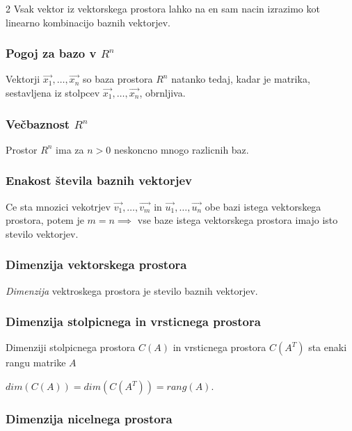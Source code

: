 \documentclass{article}
\begin{document}
\begin{multicols}{2}
	Vsak vektor iz vektorskega prostora lahko na en sam nacin izrazimo
	kot linearno kombinacijo baznih vektorjev.

	\subsubsection{Pogoj za bazo v $R^n$}

	Vektorji $\vec{x_{1}}, \dots,\vec{x_{n}}$ so baza prostora $R^{n}$ natanko tedaj, kadar
	je matrika, sestavljena iz stolpcev $\vec{x_{1}}, \dots,\vec{x_{n}}$, obrnljiva.

	\subsubsection{Večbaznost $R^n$}

	Prostor $R^{n}$ ima za $n > 0$ neskoncno mnogo razlicnih baz.

	\subsubsection{Enakost števila baznih vektorjev}

	Ce sta mnozici vekotrjev {$\vec{v_{1}}, \dots,\vec{v_{m}}$} in $\vec{u_{1}}, \dots,\vec{u_{n}}$
	obe bazi istega vektorskega prostora, potem je $m = n \implies$ vse baze istega vektorskega prostora imajo
	isto stevilo vektorjev.

	\subsubsection{Dimenzija vektorskega prostora}

	\textit{Dimenzija} vektroskega prostora je stevilo baznih vektorjev.

	\subsubsection{Dimenzija stolpicnega in vrsticnega prostora}

	Dimenziji stolpicnega prostora $C(A)$ in vrsticnega prostora $C(A^{T})$ sta enaki rangu matrike $A$
	\begin{center}
		$dim(C(A)) = dim(C(A^{T})) = rang(A)$.
	\end{center}

	\subsubsection{Dimenzija nicelnega prostora}


\end{multicols}
\end{document}
